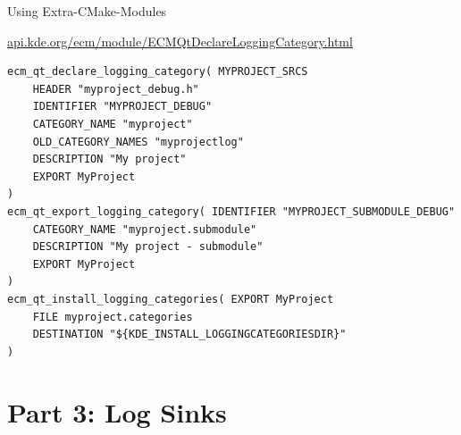 \documentclass[t,compress,aspectratio=169]{beamer}
\begin{document}
\begin{frame}[fragile]
    {Using Extra-CMake-Modules}

    \url{api.kde.org/ecm/module/ECMQtDeclareLoggingCategory.html}

    \begin{minipage}{.95\linewidth}
    \begin{lstlisting}
ecm_qt_declare_logging_category( MYPROJECT_SRCS
    HEADER "myproject_debug.h"
    IDENTIFIER "MYPROJECT_DEBUG"
    CATEGORY_NAME "myproject"
    OLD_CATEGORY_NAMES "myprojectlog"
    DESCRIPTION "My project"
    EXPORT MyProject
)
ecm_qt_export_logging_category( IDENTIFIER "MYPROJECT_SUBMODULE_DEBUG"
    CATEGORY_NAME "myproject.submodule"
    DESCRIPTION "My project - submodule"
    EXPORT MyProject
)
ecm_qt_install_logging_categories( EXPORT MyProject
    FILE myproject.categories
    DESTINATION "${KDE_INSTALL_LOGGINGCATEGORIESDIR}"
)
    \end{lstlisting}
    \end{minipage}
\end{frame}

\section{Part 3: Log Sinks}
\end{document}
